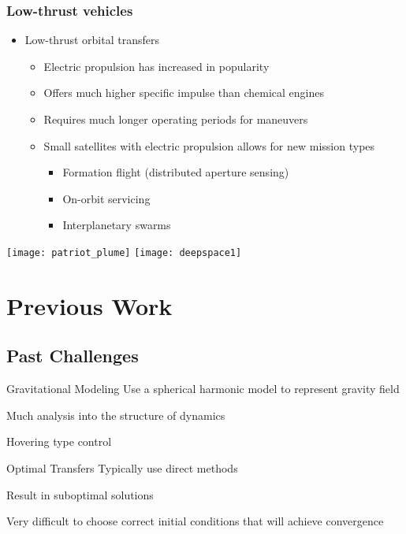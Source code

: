 \documentclass[11pt,professionalfonts]{beamer}
\begin{document}
\begin{frame} %
\frametitle{Low-thrust vehicles} %
\begin{itemize}
    \item Low-thrust orbital transfers
    \begin{itemize}
        \item Electric propulsion has increased in popularity
        \item Offers much higher specific impulse than chemical engines 
        \item Requires much longer operating periods for maneuvers 
        \item Small satellites with electric propulsion allows for new mission types
            \begin{itemize}
                \item Formation flight (distributed aperture sensing)
                \item On-orbit servicing
                \item Interplanetary swarms
            \end{itemize}
    \end{itemize}
\end{itemize}

\begin{center}
    \texttt{[image: patriot\_plume]}
    \hfill
    \texttt{[image: deepspace1]}
\end{center}
\end{frame}   %

\section*{Previous Work}
\subsection*{Past Challenges}

\begin{frame}{Gravitational Modeling} %
Use a spherical harmonic model to represent gravity field

Much analysis into the structure of dynamics

Hovering type control
\end{frame}   %

\begin{frame}{Optimal Transfers}
Typically use direct methods

Result in suboptimal solutions

Very difficult to choose correct initial conditions that will achieve convergence
\end{frame}
\end{document}
